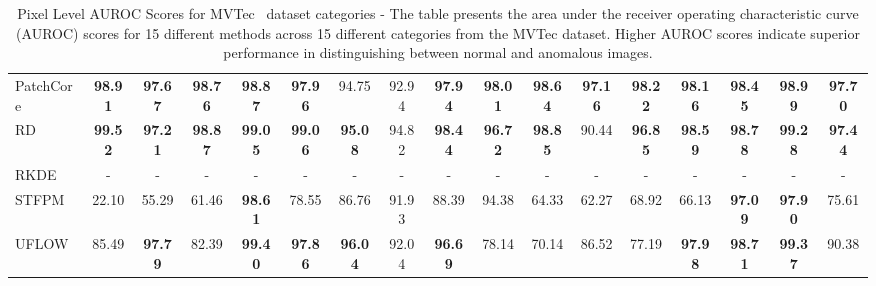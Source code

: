\begin{table}[h!]
{\begin{tabular}{l*{16}{c}}
        PatchCore & \textbf{98.91} & \textbf{97.67} & \textbf{98.76} & \textbf{98.87} & \textbf{97.96} & 94.75 & 92.94 & \textbf{97.94} & \textbf{98.01} & \textbf{98.64} & \textbf{97.16} & \textbf{98.22} & \textbf{98.16} & \textbf{98.45} & \textbf{98.99} & \textbf{97.70} \\
        RD & \textbf{99.52} & \textbf{97.21} & \textbf{98.87} & \textbf{99.05} & \textbf{99.06} & \textbf{95.08} & 94.82 & \textbf{98.44} & \textbf{96.72} & \textbf{98.85} & 90.44 & \textbf{96.85} & \textbf{98.59} & \textbf{98.78} & \textbf{99.28} & \textbf{97.44} \\
        RKDE & - & - & - & - & - & - & - & - & - & - & - & - & - & - & - & - \\
        STFPM & 22.10 & 55.29 & 61.46 & \textbf{98.61} & 78.55 & 86.76 & 91.93 & 88.39 & 94.38 & 64.33 & 62.27 & 68.92 & 66.13 & \textbf{97.09} & \textbf{97.90} & 75.61 \\
        UFLOW & 85.49 & \textbf{97.79} & 82.39 & \textbf{99.40} & \textbf{97.86} & \textbf{96.04} & 92.04 & \textbf{96.69} & 78.14 & 70.14 & 86.52 & 77.19 & \textbf{97.98} & \textbf{98.71} & \textbf{99.37} & 90.38 \\
        \bottomrule
    \end{tabular}
    }
    \caption{Pixel Level AUROC Scores for MVTec~\cite{Bergmann_2019_CVPR} dataset categories - The table presents the area under the receiver operating characteristic curve (AUROC) scores for 15 different methods across 15 different categories from the MVTec dataset. Higher AUROC scores indicate superior performance in distinguishing between normal and anomalous images.}
    \label{table:MVTec Pixel AUROC}
\end{table}